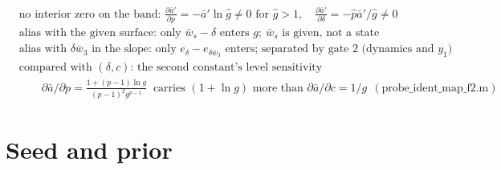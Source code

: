 \documentclass[11pt,a4paper,fontset=none]{ctexart}
\newcommand{\ba}{\bar{a}}
\newcommand{\bw}{\bar{w}}
\newcommand{\ap}{\ba'}
\newcommand{\ph}{\hat{p}}
\newcommand{\dl}{\delta}
\newcommand{\gs}{g}
\newcommand{\gh}{\hat{g}}
\begin{document}
\begin{align*}
&\text{no interior zero on the band: } \frac{\partial\ap}{\partial p} = -\ap\ln\gh \ne 0 \text{ for } \gh > 1,\quad \frac{\partial\ap}{\partial\dl} = -\ph\ap/\gh \ne 0 \\
&\text{alias with the given surface: only } \bw_s - \dl \text{ enters } \gs;\ \bw_s \text{ is given, not a state} \\
&\text{alias with } \delta\bw_3 \text{ in the slope: only } e_{\dl} - e_{\delta\bw_3} \text{ enters; separated by gate 2 (dynamics and } y_1\text{)} \\
&\text{compared with } (\dl, c)\text{: the second constant's level sensitivity} \\
&\qquad \partial\ba/\partial p = \tfrac{1 + (p-1)\ln\gs}{(p-1)^2\gs^{p-1}} \ \text{ carries } (1 + \ln\gs) \text{ more than } \partial\ba/\partial c = 1/\gs
 \ \ (\text{probe\_ident\_map\_f2.m})
\end{align*}

\section*{Seed and prior}
\end{document}
